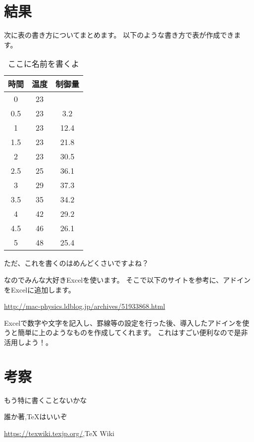 \documentclass[11pt,a4paper]{jsarticle}
\begin{document}
\section{結果}
次に表の書き方についてまとめます。
以下のような書き方で表が作成できます。
\begin{table}[htbp]
\centering
\caption{ここに名前を書くよ}
\begin{tabular}{ccc}
\toprule
\multicolumn{1}{l}{時間} & \multicolumn{1}{l}{温度} & \multicolumn{1}{l}{制御量} \\
\midrule
0 & 23 & \\
0.5 & 23 & 3.2 \\
1 & 23 & 12.4 \\
1.5 & 23 & 21.8 \\
2 & 23 & 30.5 \\
2.5 & 25 & 36.1 \\	
3 & 29 & 37.3 \\
3.5 & 35 & 34.2 \\
4 & 42 & 29.2 \\
4.5 & 46 & 26.1 \\
5 & 48 & 25.4 \\
\bottomrule
\end{tabular}%
\label{tab:addlabel}%
\end{table}%
ただ、これを書くのはめんどくさいですよね？

なのでみんな大好きExcelを使います。
そこで以下のサイトを参考に、アドインをExcelに追加します。

\url{http://mac-physics.ldblog.jp/archives/51933868.html}

Excelで数字や文字を記入し、罫線等の設定を行った後、導入したアドインを使うと簡単に上のようなものを作成してくれます。
これはすごい便利なので是非活用しよう！。

\section{考察}
もう特に書くことないかな



\forall 
\begin{thebibliography}{99}
\item 誰か著,TeXはいいぞ
\item \url{https://texwiki.texjp.org/},TeX Wiki
\end{thebibliography}
\end{document}
